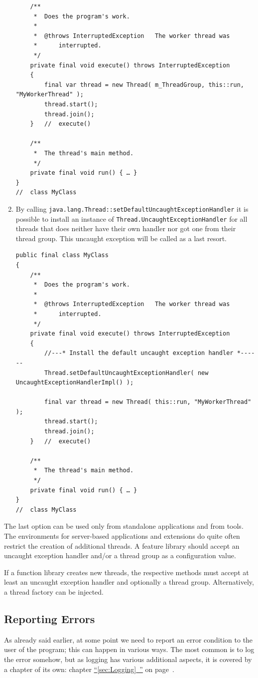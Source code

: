 \documentclass[11pt,a4paper, titlepage, parskip=half, headsepline, footsepline, cleardoublepage=current, headheight=1cm]{scrbook}
\newcommand*{\tqfullvref}[1]{\hyperref[{#1}]{“\ref*{#1}~\nameref*{#1}”} on page~\pageref{#1}}
\begin{document}
\begin{enumerate}
{\begin{lstlisting}
    /**
     *  Does the program's work.
     *
     *  @throws InterruptedException   The worker thread was
     *      interrupted.
     */
    private final void execute() throws InterruptedException
    {
        final var thread = new Thread( m_ThreadGroup, this::run, "MyWorkerThread" );
        thread.start();
        thread.join();
    }   //  execute()
     
    /**
     *  The thread's main method.
     */
    private final void run() { … }
}
//  class MyClass
\end{lstlisting}
}
\item{By calling \lstinline|java.lang.Thread::setDefaultUncaughtExceptionHandler|\autocite{ORACLE_DOC_THREAD:setDefaultUncaughtExceptionHandler} it is possible to install an instance of \lstinline|Thread.UncaughtExceptionHandler| for all threads that does neither have their own handler nor got one from their thread group. This uncaught exception will be called as a last resort.
\begin{lstlisting}
public final class MyClass
{
    /**
     *  Does the program's work.
     *
     *  @throws InterruptedException   The worker thread was
     *      interrupted.
     */
    private final void execute() throws InterruptedException
    {
        //---* Install the default uncaught exception handler *------
        Thread.setDefaultUncaughtExceptionHandler( new UncaughtExceptionHandlerImpl() );
        
        final var thread = new Thread( this::run, "MyWorkerThread" );
        thread.start();
        thread.join();
    }   //  execute()
     
    /**
     *  The thread's main method.
     */
    private final void run() { … }
}
//  class MyClass
\end{lstlisting}
}
\end{enumerate}

The last option can be used only from standalone applications and from tools. The environments for server-based applications and extensions do quite often restrict the creation of additional threads. A feature library should accept an uncaught exception handler and/or a thread group as a configuration value.

If a function library creates new threads, the respective methods must accept at least an uncaught exception handler and optionally a thread group. Alternatively, a thread factory\autocite{ORACLE_DOC_THREADFACTORY_INTERFACE} can be injected.
 
\subsection{Reporting Errors}\label{sec:ReportingErrors}
As already said earlier, at some point we need to report an error condition to the user of the program; this can happen in various ways. The most common is to log the error somehow, but as logging has various additional aspects, it is covered by a chapter of its own: chapter \tqfullvref{sec:Logging}.
\end{document}
